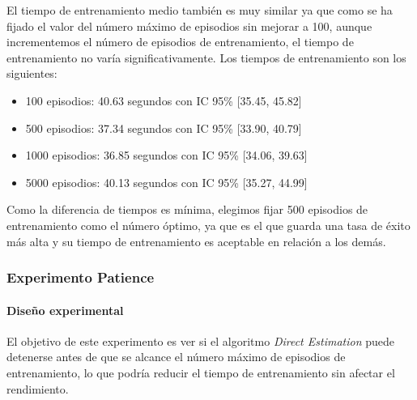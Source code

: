 El tiempo de entrenamiento medio también es muy similar ya que como se ha fijado el valor del número máximo de episodios sin mejorar a 100, aunque incrementemos el número de episodios de entrenamiento, el tiempo de entrenamiento no varía significativamente. Los tiempos de entrenamiento son los siguientes:
\begin{itemize}
    \item 100 episodios: 40.63 segundos con IC 95\% [35.45,  45.82]
    \item 500 episodios: 37.34 segundos con IC 95\% [33.90,  40.79]
    \item 1000 episodios: 36.85 segundos con IC 95\% [34.06,  39.63]
    \item 5000 episodios: 40.13 segundos con IC 95\% [35.27,  44.99]
\end{itemize}

Como la diferencia de tiempos es mínima, elegimos fijar 500 episodios de entrenamiento como el número óptimo, ya que es el que guarda una tasa de éxito más alta y su tiempo de entrenamiento es aceptable en relación a los demás.
\newpage
\subsubsection{Experimento Patience}

\paragraph{Diseño experimental}

El objetivo de este experimento es ver si el algoritmo \textit{Direct Estimation} puede detenerse antes de que se alcance el número máximo de episodios de entrenamiento, lo que podría reducir el tiempo de entrenamiento sin afectar el rendimiento.

